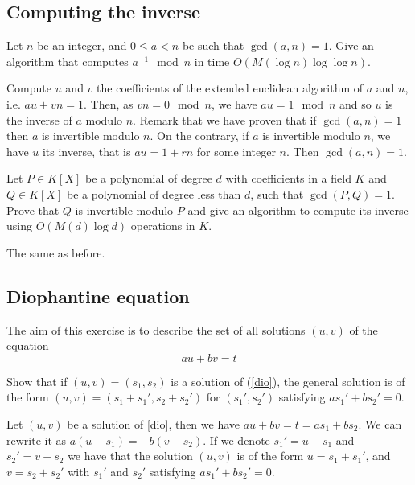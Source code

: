 \documentclass[11pt]{exam}
\theoremstyle{definition}
\begin{document}
{\subsection{Computing the inverse}

\begin{questions}
	
	\question Let $n$ be an integer, and $0 \leq a <n$ be such that $\gcd (a,n) = 1$. Give an algorithm that computes $a^{-1} \mod n$ in time $O(M(\log n) \log \log n)$.
	
	\begin{solution}
		Compute $u$ and $v$ the coefficients of the extended euclidean algorithm of $a$ and $n$, i.e. $a u + v n = 1$. Then, as $vn = 0 \mod n$, we have $au = 1 \mod n$ and so $u$ is the inverse of $a$ modulo $n$. Remark that we have proven that if $\gcd(a,n) = 1$ then $a$ is invertible modulo $n$. On the contrary, if $a$ is invertible modulo $n$, we have $u$ its inverse, that is $au = 1 + r n$ for some integer $n$. Then $\gcd(a,n) = 1$.
	\end{solution}
	
	\question Let $P \in K[X]$ be a polynomial of degree $d$ with coefficients in a field $K$ and $Q \in K[X]$ be a polynomial of degree less than $d$, such that $\gcd(P,Q) = 1$. Prove that $Q$ is invertible modulo $P$ and give an algorithm to compute its inverse using $O(M(d) \log d)$ operations in $K$.
	
	\begin{solution}
		The same as before.
	\end{solution}
	
\end{questions}

\subsection{Diophantine equation}
The aim of this exercise is to describe the set of all solutions $(u,v)$ of the equation 
\begin{equation}\label{dio}
au+bv=t
\end{equation}

\begin{questions}
	\question Show that if $(u,v)=(s_1,s_2)$ is a solution of (\ref{dio}), the general solution is of the form $(u,v)=(s_1+s_1',s_2+s_2')$ for $(s_1',s_2')$ satisfying  $as_1' + bs_2' = 0$.
	
	\begin{solution}
		Let $(u,v)$ be a solution of \ref{dio}, then we have $au + bv = t = a s_1 + b s_2$. We can rewrite it as $a(u-s_1) = -b(v - s_2)$. If we denote $s_1' = u-s_1$ and $s_2' = v-s_2$ we have that the solution $(u,v)$ is of the form $u = s_1 + s_1'$, and $v = s_2 + s_2'$ with $s_1'$ and $s_2'$ satisfying $as_1' + b s_2' = 0$.
	\end{solution}
	

\end{questions}}
\end{document}
